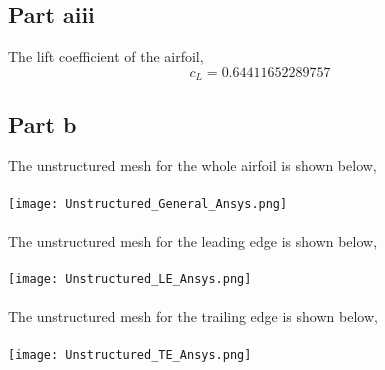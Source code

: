 \documentclass[a4paper, 12pt]{report}
\def\sizes{0.29}
\begin{document}
\begin{center}
\subsection{Part aiii}
The lift coefficient of the airfoil, 
$$c_L = 0.64411652289757$$
\subsection{Part b}
The unstructured mesh for the whole airfoil is shown below,
\\~\\\texttt{[image: Unstructured\_General\_Ansys.png]}
\\~\\The unstructured mesh for the leading edge is shown below,
\\~\\\texttt{[image: Unstructured\_LE\_Ansys.png]}
\\~\\The unstructured mesh for the trailing edge is shown below,
\\~\\\texttt{[image: Unstructured\_TE\_Ansys.png]}
\end{center}
\end{document}
